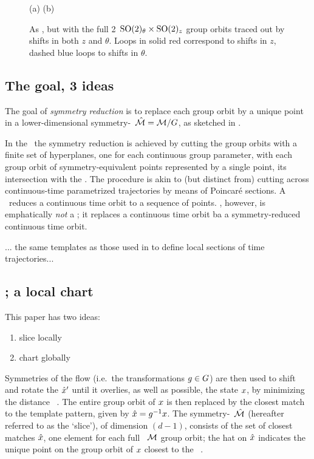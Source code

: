 \begin{figure}
  \centering
(a)%
(b)%
  \caption{\label{fig:2830GO6}
As , but with the
full 2\dmn\ $\textrm{SO}(2)_{\theta} \times \textrm{SO}(2)_z$ group orbits traced out
by shifts in both $z$ and $\theta$. Loops in solid red correspond to
shifts in $z$, dashed blue loops to shifts in $\theta$.
  }
\end{figure}

\subsection{The goal, 3 ideas}

The goal of \emph{symmetry reduction} is to replace each group orbit by a
unique point in a lower-dimensional symmetry-\reducedsp\ $\hat{\cal M} =
{\cal M}/G$, as sketched in .

In the \mslices\ the symmetry reduction is achieved by cutting the group
orbits with a finite set of hyperplanes, one for each continuous group
parameter, with each group orbit of symmetry-equivalent points
represented by a single point, its intersection with the \slice. The
procedure is akin to (but distinct from) cutting across continuous-time
parametrized trajectories by means of Poincar\'e sections.
A \PoincSec\ reduces a continuous time orbit
        to a sequence of points. \Slice, however,
         is emphatically \emph{not} a \PoincSec; it replaces a continuous
         time orbit ba a symmetry-reduced continuous time orbit.

... the same templates as those used in  to define local
sections of time trajectories...

\subsection{\Mslices; a local chart}

This paper has two ideas:
\begin{enumerate}
  \item slice locally
  \item chart globally
\end{enumerate}


Symmetries of the flow (i.e.\ the transformations $g\in G$) are
then used to shift and rotate the {\template} ${\hat{x}'}$ until it
overlies, as well as possible, the state $x$, by minimizing the
distance
\beq
\Norm{\ssp - \LieEl(\gSpace)\,\slicep}
\, .
The entire group orbit of $x$ is then replaced by the closest match to
the template pattern, given by $\hat{x}=g^{-1}x$. The
symmetry-\reducedsp\ $\hat{\cal M}$ (hereafter referred to as the `slice'), of
dimension $(d\!-\!1)$, consists of the set of closest matches $\hat{x}$,
one element for each full \statesp\ ${\cal M}$ group orbit; the hat on
$\hat{x}$ indicates the unique point on the group orbit of $x$ closest
to the \template\ \slicep.

